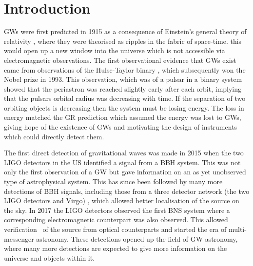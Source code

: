\chapter{\label{intro}Introduction}


\Glspl{GW} were first predicted in 1915 as a consequence of Einstein's general
theory of relativity \citep{einstein2005GrundlageAllgemeinen}, where they were
theorised as ripples in the fabric of space-time.  this would open up a new window into the universe which is not accessible via electromagnetic observations. 
The first observational evidence that \glspl{GW} exist came from observations of the Hulse-Taylor
binary \citep{weisberg1981GravitationalWaves,weisberg2004RelativisticBinary}, which subsequently won the Nobel prize in 1993.
This observation, which was of a pulsar in a binary system showed that the periastron was
reached slightly early after each orbit, implying that the pulsars orbital radius was
decreasing with time.  If the separation of two orbiting objects is decreasing
then the system must be losing energy.  The loss in energy matched the \gls{GR}
prediction which assumed the energy was lost to \glspl{GW}, giving hope of
the existence of \glspl{GW} and motivating the design of instruments
which could directly detect them.

The first direct detection of gravitational
waves was made in 2015 when the two \gls{LIGO} detectors in the US
\citep{abbott2016ObservationGravitational} identified a signal from a \gls{BBH}
system.  This was not only the first observation of a \gls{GW} but gave
information on an as yet unobserved type of astrophysical
system.  This has since been followed by many more detections of \gls{BBH}
signals, including those from a three detector network (the two \gls{LIGO} detectors and Virgo)
\citep{abbott2017GW170814ThreeDetector,theligoscientificcollaboration2020GW190425Observation}, which allowed better localisation of the source on the sky.  
In 2017 the \gls{LIGO} detectors observed the
first \gls{BNS} system \citep{abbott2017GW170817Observation} where a
corresponding electromagnetic counterpart was also observed.
This allowed verification~ of the source from optical counterparts and started the era of
multi-messenger astronomy.  These detections opened up the field of
\gls{GW} astronomy, where many more detections are expected to give more
information on the universe and objects within it.

